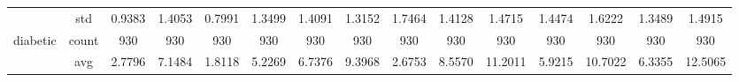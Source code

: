 \begin{table}[htbp]
{\begin{tabular}{rcccc|c|c|c|c|c|ccccc}
			                                                                               & std                                    & 0.9383                                                                             & 1.4053                                                                    & 0.7991                                                                    & 1.3499                                         & 1.4091                                                                    & 1.3152                                       & 1.7464                                      & 1.4128                                         & 1.4715                                         & 1.4474                                          & 1.6222                                          & 1.3489                                         & 1.4915                                         \\
			diabetic                                                                       & count                                  & 930                                                                                & 930                                                                       & 930                                                                       & 930                                            & 930                                                                       & 930                                          & 930                                         & 930                                            & 930                                            & 930                                             & 930                                             & 930                                            & 930                                            \\
			                                                                               & avg                                    & 2.7796                                                                             & 7.1484                                                                    & \cellcolor[rgb]{ .776,  .937,  .808}\textcolor[rgb]{ 0,  .38,  0}{1.8118} & 5.2269                                         & 6.7376                                                                    & 9.3968                                       & 2.6753                                      & 8.5570                                         & 11.2011                                        & 5.9215                                          & 10.7022                                         & 6.3355                                         & 12.5065                                        \\

\end{tabular}}
\end{table}
